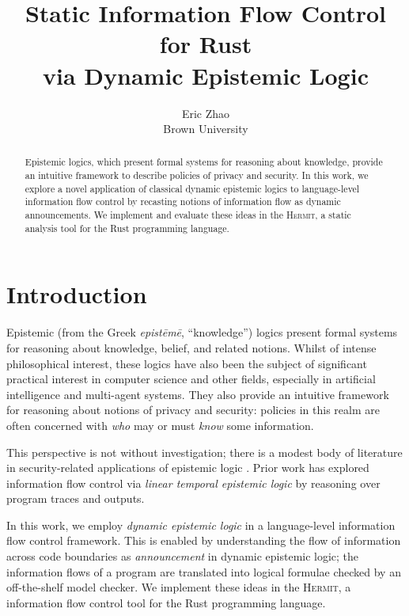 \documentclass[letterpaper,twocolumn,10pt]{article}
\newcommand{\Hermit}{\textsc{Hermit}\xspace}
\begin{document}
\ActivateVerbatimLigatures

\date{}

\title{\Large \bf
  Static Information Flow Control for Rust \\
    via Dynamic Epistemic Logic
}

\author{
  {\rm Eric Zhao} \\
  Brown University
}

\maketitle

\begin{abstract}
Epistemic logics, which present formal systems for reasoning about knowledge, provide an intuitive framework to describe policies of privacy and security.
In this work, we explore a novel application of classical dynamic epistemic logics to language-level information flow control by recasting notions of information flow as dynamic announcements.
We implement and evaluate these ideas in the \Hermit, a static analysis tool for the Rust programming language.
\end{abstract}

\section{Introduction}

Epistemic (from the Greek \emph{epistēmē}, ``knowledge'') logics present formal systems for reasoning about knowledge, belief, and related notions.
Whilst of intense philosophical interest, these logics have also been the subject of significant practical interest in computer science and other fields, especially in artificial intelligence and multi-agent systems.
They also provide an intuitive framework for reasoning about notions of privacy and security:
policies in this realm are often concerned with \emph{who} may or must \emph{know} some information.

This perspective is not without investigation; there is a modest body of literature in security-related applications of epistemic logic \cite{aucher_2011a, dechesne_2010a, koleini_2013a, soloviev_2024a}.
Prior work \cite{balliu_2011a} has explored information flow control via \emph{linear temporal epistemic logic} by reasoning over program traces and outputs.

In this work, we employ \emph{dynamic epistemic logic} in a language-level information flow control framework.
This is enabled by understanding the flow of information across code boundaries as \emph{announcement} in dynamic epistemic logic; the information flows of a program are translated into logical formulae checked by an off-the-shelf model checker.
We implement these ideas in the \Hermit, a information flow control tool for the Rust programming language.
\end{document}
